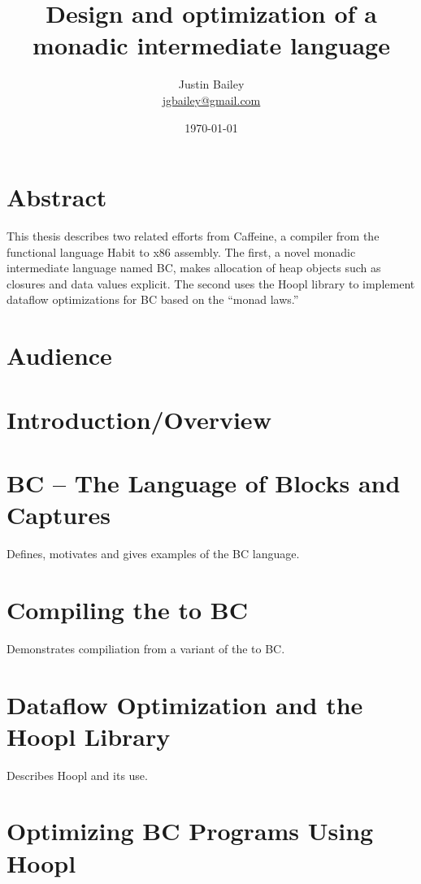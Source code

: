 \documentclass[11pt]{article}
\title{Design and optimization of a monadic intermediate language}
\author{Justin Bailey \\ \url{jgbailey@gmail.com}}
\date{\today}
\begin{document}
\VerbatimFootnotes
\DefineShortVerb{\#}
\doublespacing

\maketitle

\section{Abstract}

This thesis describes two related efforts from Caffeine, a compiler
from the functional language Habit to x86 assembly. The
first, a novel monadic intermediate language named BC, makes
allocation of heap objects such as closures and data values
explicit. The second uses the Hoopl library to implement dataflow
optimizations for BC based on the ``monad laws.''

\section{Audience}

\section{Introduction/Overview}

\section{BC -- The Language of Blocks and Captures}

Defines, motivates and gives examples of the BC language.

\section{Compiling the \lamA to BC}

Demonstrates compiliation from a variant of the \lamA to BC. 

\section{Dataflow Optimization and the Hoopl Library}

Describes Hoopl and its use.

\section{Optimizing BC Programs Using Hoopl}
\end{document}
